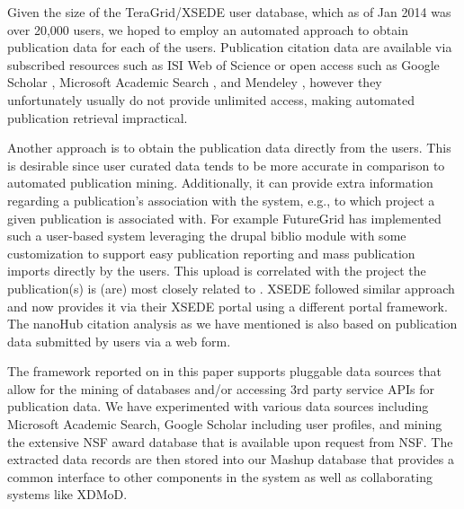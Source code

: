 \documentclass{tex/sig-alternate}
\begin{document}
Given the size of the TeraGrid/XSEDE user database, which as of Jan 2014 was over 20,000 users, we hoped to employ an automated approach to obtain publication data for each of the users. Publication citation data are available via subscribed resources such as ISI Web of Science \cite{www-isiwos} or open access such as Google Scholar \cite{www-googlescholar}, Microsoft Academic Search \cite{www-msas}, and Mendeley \cite{www-mendeley}, however they unfortunately usually do not provide unlimited access, making automated publication retrieval impractical. 
 
Another approach is to obtain the publication data directly from the users. This is desirable since user curated data tends to be more accurate in comparison to automated publication mining. Additionally, it can provide extra information regarding a publication's association with the system, e.g., to which project a given publication is associated with. 
For example FutureGrid has implemented such a user-based system leveraging the drupal biblio module \cite{www-drupal-bib} with some customization to support easy publication reporting and mass publication imports directly by the users. This upload is correlated with the project the publication(s) is (are) most closely related to \cite{www-fgbiblio}. XSEDE followed similar approach and now provides it via their XSEDE portal \cite{www-xdportalpub} using a different portal framework. The nanoHub citation analysis \cite{www-nanohubcite} as we have mentioned is also based on publication data submitted by users via a web form. 
 
The framework reported on in this paper supports pluggable data sources that allow for the mining of databases and/or accessing 3rd party service APIs for publication data. We have experimented with various data sources including Microsoft Academic Search, Google Scholar including user profiles, and mining the extensive NSF award database that is available upon request from NSF. The extracted data records are then stored into our Mashup database that provides a common interface to other components in the system as well as collaborating systems like XDMoD.
 
\end{document}
